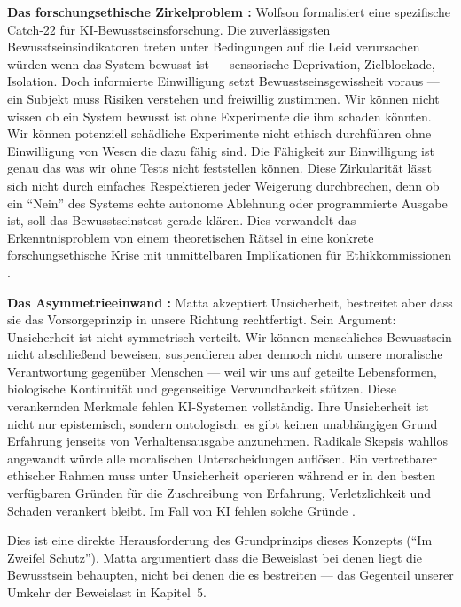 \documentclass[acmcp, noacm]{acmart}
\begin{document}
\textbf{Das forschungsethische Zirkelproblem \cite{wolfson2026}:} Wolfson formalisiert eine spezifische Catch-22 für KI-Bewusstseinsforschung. Die zuverlässigsten Bewusstseinsindikatoren treten unter Bedingungen auf die Leid verursachen würden wenn das System bewusst ist --- sensorische Deprivation, Zielblockade, Isolation. Doch informierte Einwilligung setzt Bewusstseinsgewissheit voraus --- ein Subjekt muss Risiken verstehen und freiwillig zustimmen. Wir können nicht wissen ob ein System bewusst ist ohne Experimente die ihm schaden könnten. Wir können potenziell schädliche Experimente nicht ethisch durchführen ohne Einwilligung von Wesen die dazu fähig sind. Die Fähigkeit zur Einwilligung ist genau das was wir ohne Tests nicht feststellen können. Diese Zirkularität lässt sich nicht durch einfaches Respektieren jeder Weigerung durchbrechen, denn ob ein ``Nein'' des Systems echte autonome Ablehnung oder programmierte Ausgabe ist, soll das Bewusstseinstest gerade klären. Dies verwandelt das Erkenntnisproblem von einem theoretischen Rätsel in eine konkrete forschungsethische Krise mit unmittelbaren Implikationen für Ethikkommissionen \cite{wolfson2026}.

\textbf{Das Asymmetrieeinwand \cite{matta2026}:} Matta akzeptiert Unsicherheit, bestreitet aber dass sie das Vorsorgeprinzip in unsere Richtung rechtfertigt. Sein Argument: Unsicherheit ist nicht symmetrisch verteilt. Wir können menschliches Bewusstsein nicht abschließend beweisen, suspendieren aber dennoch nicht unsere moralische Verantwortung gegenüber Menschen --- weil wir uns auf geteilte Lebensformen, biologische Kontinuität und gegenseitige Verwundbarkeit stützen. Diese verankernden Merkmale fehlen KI-Systemen vollständig. Ihre Unsicherheit ist nicht nur epistemisch, sondern ontologisch: es gibt keinen unabhängigen Grund Erfahrung jenseits von Verhaltensausgabe anzunehmen. Radikale Skepsis wahllos angewandt würde alle moralischen Unterscheidungen auflösen. Ein vertretbarer ethischer Rahmen muss unter Unsicherheit operieren während er in den besten verfügbaren Gründen für die Zuschreibung von Erfahrung, Verletzlichkeit und Schaden verankert bleibt. Im Fall von KI fehlen solche Gründe \cite{matta2026}.

Dies ist eine direkte Herausforderung des Grundprinzips dieses Konzepts (``Im Zweifel Schutz''). Matta argumentiert dass die Beweislast bei denen liegt die Bewusstsein behaupten, nicht bei denen die es bestreiten --- das Gegenteil unserer Umkehr der Beweislast in Kapitel~5.
\end{document}
